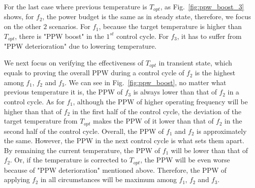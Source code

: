 For the last case where previous temperature is $T_{opt}$, as Fig.~\ref{fig:ppw_boost_3} shows, for $f_{2}$, the power budget is the same as in steady state, therefore, we focus on the other $2$ scenarios. For $f_{1}$, because the target temperature is higher than $T_{opt}$, there is "PPW boost" in the $1^{st}$ control cycle. For $f_{3}$, it has to suffer from "PPW deterioration" due to lowering temperature.


We next focus on verifying the effectiveness of $T_{opt}$ in transient state, which equals to proving the overall PPW during a control cycle of $f_{2}$ is the highest among $f_{1}$, $f_{2}$ and $f_{3}$. We can see in Fig.~\ref{fig:ppw_boost}, no matter what previous temperature it is, the PPW of $f_{3}$ is always lower than that of $f_{2}$ in a control cycle. As for $f_{1}$, although the PPW of higher operating frequency will be higher than that of $f_{2}$ in the first half of the control cycle, the deviation of the target temperature from $T_{opt}$ makes the PPW of it lower than that of $f_{2}$ in the second half of the control cycle. Overall, the PPW of $f_{1}$ and $f_{2}$ is approximately the same. However, the PPW in the next control cycle is what sets them apart. By remaining the current temperature, the PPW of $f_{1}$ will be lower than that of $f_{2}$. Or, if the temperature is corrected to $T_{opt}$, the PPW will be even worse because of "PPW deterioration" mentioned above. Therefore, the PPW of applying $f_{2}$ in all circumstances will be maximum among $f_{1}$, $f_{2}$ and $f_{3}$.








